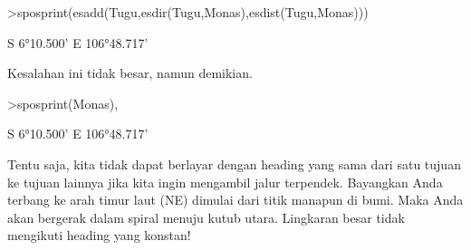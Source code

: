 \documentclass[12pt,arial,letterpaper]{book}
\begin{document}
\begin{eulercomment}
\begin{eulercomment}
\begin{eulercomment}
\begin{eulercomment}
\begin{eulercomment}
\begin{eulercomment}
\begin{eulercomment}
\begin{eulercomment}
\begin{eulercomment}
\begin{eulercomment}
\begin{eulercomment}
\begin{eulercomment}
\begin{eulercomment}
\begin{eulercomment}
\begin{eulercomment}
\begin{eulercomment}
\begin{eulercomment}
\begin{eulercomment}
\begin{eulercomment}
\begin{eulercomment}
\begin{eulercomment}
\begin{eulercomment}
\begin{eulercomment}
\begin{eulercomment}
\begin{eulercomment}
\begin{eulercomment}
\begin{eulercomment}
\begin{eulercomment}
\begin{eulercomment}
\begin{eulercomment}
\begin{eulerprompt}
>sposprint(esadd(Tugu,esdir(Tugu,Monas),esdist(Tugu,Monas)))
\end{eulerprompt}
\begin{euleroutput}
  S 6°10.500' E 106°48.717'
\end{euleroutput}
\begin{eulercomment}
Kesalahan ini tidak besar, namun demikian.
\end{eulercomment}
\begin{eulerprompt}
>sposprint(Monas),
\end{eulerprompt}
\begin{euleroutput}
  S 6°10.500' E 106°48.717'
\end{euleroutput}
\begin{eulercomment}
Tentu saja, kita tidak dapat berlayar dengan heading yang sama dari
satu tujuan ke tujuan lainnya jika kita ingin mengambil jalur
terpendek. Bayangkan Anda terbang ke arah timur laut (NE) dimulai dari
titik manapun di bumi. Maka Anda akan bergerak dalam spiral menuju
kutub utara. Lingkaran besar tidak mengikuti heading yang konstan!


\end{eulercomment}
\end{eulercomment}
\end{eulercomment}
\end{eulercomment}
\end{eulercomment}
\end{eulercomment}
\end{eulercomment}
\end{eulercomment}
\end{eulercomment}
\end{eulercomment}
\end{eulercomment}
\end{eulercomment}
\end{eulercomment}
\end{eulercomment}
\end{eulercomment}
\end{eulercomment}
\end{eulercomment}
\end{eulercomment}
\end{eulercomment}
\end{eulercomment}
\end{eulercomment}
\end{eulercomment}
\end{eulercomment}
\end{eulercomment}
\end{eulercomment}
\end{eulercomment}
\end{eulercomment}
\end{eulercomment}
\end{eulercomment}
\end{eulercomment}
\end{eulercomment}
\end{document}
